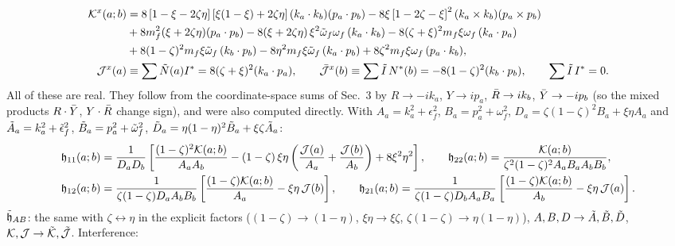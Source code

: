 \documentclass[9pt]{article}
\numberwithin{equation}{section}
\begin{document}
\begin{align}\label{eq:Kx}
    \mathcal{K}^{x}(a;b) & = 8\left[1-\xi-2\zeta\eta\right]\left[\xi(1-\xi)+2\zeta\eta\right](k_{a}\cdot k_{b})(p_{a}\cdot p_{b})-8\xi\left[1-2\zeta-\xi\right]^{2}(k_{a}\times k_{b})(p_{a}\times p_{b})\notag \\
    & +8m^{2}_{f}(\xi+2\zeta\eta)(p_{a}\cdot p_{b})-8(\xi+2\zeta\eta)\,\xi^{2}\Tilde{\omega}_{f}\omega_{f}\,(k_{a}\cdot k_{b})-8(\zeta+\xi)^{2}m_{f}\xi\omega_{f}\,(k_{a}\cdot p_{a})\notag \\
    & +8(1-\zeta)^{2}m_{f}\xi\Tilde{\omega}_{f}\,(k_{b}\cdot p_{b})-8\eta^{2}m_{f}\xi\Tilde{\omega}_{f}\,(k_{a}\cdot p_{b})+8\zeta^{2}m_{f}\xi\omega_{f}\,(p_{a}\cdot k_{b}),\notag \\
    \mathcal{J}^{x}(a) & \equiv\sum\Tilde{N}(a)I^{*} = 8(\zeta+\xi)^{2}(k_{a}\cdot p_{a}),\hspace{2em} \Bar{\mathcal{J}}^{x}(b)\equiv\sum\Tilde{I}\,N^{*}(b) = -8(1-\zeta)^{2}(k_{b}\cdot p_{b}),\hspace{2em}\sum\Tilde{I}\,I^{*}=0 .
\end{align}
All of these are real. They follow from the coordinate-space sums of Sec.~3 by $R\rightarrow-ik_{a}$, $Y\rightarrow ip_{a}$, $\Bar{R}\rightarrow ik_{b}$, $\Bar{Y}\rightarrow-ip_{b}$ (so the mixed products $R\cdot\Bar{Y}$, $Y\cdot\Bar{R}$ change sign), and were also computed directly. With $A_{a}=k^{2}_{a}+\epsilon^{2}_{f}$, $B_{a}=p^{2}_{a}+\omega^{2}_{f}$, $D_{a}=\zeta(1-\zeta)^{2}B_{a}+\xi\eta A_{a}$ and $\Tilde{A}_{a}=k^{2}_{a}+\Tilde{\epsilon}^{2}_{f}$, $\Tilde{B}_{a}=p^{2}_{a}+\Tilde{\omega}^{2}_{f}$, $\Tilde{D}_{a}=\eta(1-\eta)^{2}\Tilde{B}_{a}+\xi\zeta\Tilde{A}_{a}$:
\begin{align}\label{eq:hqb}
    \mathfrak{h}_{11}(a;b) & = \frac{1}{D_{a}D_{b}}\left[\frac{(1-\zeta)^{2}\mathcal{K}(a;b)}{A_{a}A_{b}}-(1-\zeta)\,\xi\eta\left(\frac{\mathcal{J}(a)}{A_{a}}+\frac{\mathcal{J}(b)}{A_{b}}\right)+8\xi^{2}\eta^{2}\right],\hspace{2em} \mathfrak{h}_{22}(a;b) = \frac{\mathcal{K}(a;b)}{\zeta^{2}(1-\zeta)^{2}A_{a}B_{a}A_{b}B_{b}},\notag \\
    \mathfrak{h}_{12}(a;b) & = \frac{1}{\zeta(1-\zeta)D_{a}A_{b}B_{b}}\left[\frac{(1-\zeta)\mathcal{K}(a;b)}{A_{a}}-\xi\eta\,\mathcal{J}(b)\right],\hspace{2em} \mathfrak{h}_{21}(a;b) = \frac{1}{\zeta(1-\zeta)D_{b}A_{a}B_{a}}\left[\frac{(1-\zeta)\mathcal{K}(a;b)}{A_{b}}-\xi\eta\,\mathcal{J}(a)\right].
\end{align}
$\Tilde{\mathfrak{h}}_{AB}$: the same with $\zeta\leftrightarrow\eta$ in the explicit factors ($(1-\zeta)\rightarrow(1-\eta)$, $\xi\eta\rightarrow\xi\zeta$, $\zeta(1-\zeta)\rightarrow\eta(1-\eta)$), $A,B,D\rightarrow\Tilde{A},\Tilde{B},\Tilde{D}$, $\mathcal{K},\mathcal{J}\rightarrow\Tilde{\mathcal{K}},\Tilde{\mathcal{J}}$. Interference:
\end{document}
